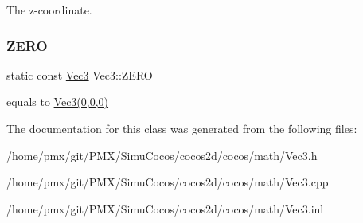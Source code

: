 The z-\/coordinate. \mbox{\label{classVec3_a26c0c52a5fba36ed0ef5e6d5026569f4}} 
\subsubsection{\texorpdfstring{Z\+E\+RO}{ZERO}}
{\footnotesize\ttfamily static const \hyperlink{classVec3}{Vec3} Vec3\+::\+Z\+E\+RO\hspace{0.3cm}{\ttfamily [static]}}

equals to \hyperlink{classVec3}{Vec3(0,0,0)} 

The documentation for this class was generated from the following files\+:\begin{DoxyCompactItemize}
\item 
/home/pmx/git/\+P\+M\+X/\+Simu\+Cocos/cocos2d/cocos/math/Vec3.\+h\item 
/home/pmx/git/\+P\+M\+X/\+Simu\+Cocos/cocos2d/cocos/math/Vec3.\+cpp\item 
/home/pmx/git/\+P\+M\+X/\+Simu\+Cocos/cocos2d/cocos/math/Vec3.\+inl\end{DoxyCompactItemize}
